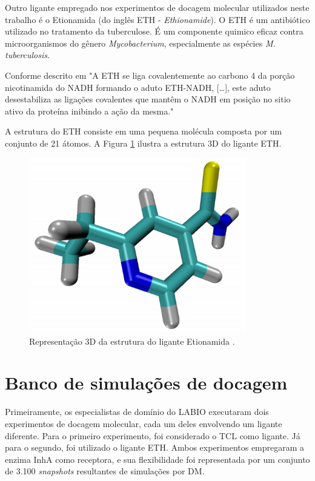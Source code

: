 Outro ligante empregado nos experimentos de docagem molecular utilizados neste trabalho é o Etionamida (do inglês ETH - \emph{Ethionamide}). O ETH é um antibiótico utilizado no tratamento da tuberculose. É um componente quimico eficaz contra microorganismos do gênero \emph{Mycobacterium}, especialmente as espécies \emph{M. tuberculosis}. 

Conforme descrito em \cite{COH10} "A ETH se liga covalentemente ao carbono 4 da porção nicotinamida do NADH formando o aduto ETH-NADH, […], este aduto desestabiliza as ligações covalentes que mantêm o NADH em posição no sitio ativo da proteína inibindo a ação da mesma."

A estrutura do ETH consiste em uma pequena molécula composta por um conjunto de 21 átomos. A Figura \ref{fig:eth} ilustra a estrutura 3D do ligante ETH.

\begin{figure}[h]
	\center
	\includegraphics[width=9.5cm]{images/eth.png}
	\caption{Representação 3D da estrutura do ligante Etionamida \cite{kar11}.}
	\label{fig:eth}
\end{figure}

\section{Banco de simulações de docagem}

Primeiramente, os especialistas de domínio do LABIO executaram dois experimentos de docagem molecular, cada um deles envolvendo um ligante diferente. Para o primeiro experimento, foi considerado o TCL como ligante. Já para o segundo, foi utilizado o ligante ETH. Ambos experimentos empregaram a enzima InhA como receptora, e sua flexibilidade foi representada por um conjunto de 3.100 \emph{snapshots} resultantes de simulações por DM. 

